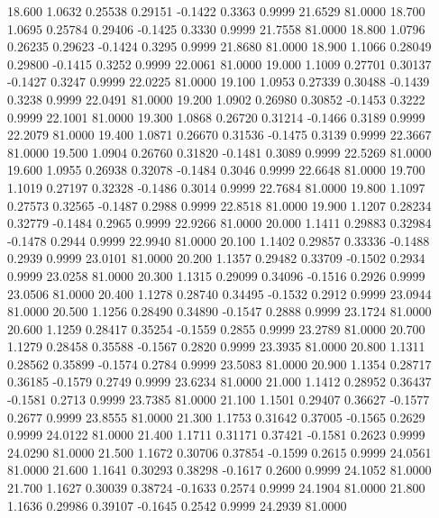   18.600   1.0632   0.25538   0.29151  -0.1422   0.3363   0.9999  21.6529  81.0000
  18.700   1.0695   0.25784   0.29406  -0.1425   0.3330   0.9999  21.7558  81.0000
  18.800   1.0796   0.26235   0.29623  -0.1424   0.3295   0.9999  21.8680  81.0000
  18.900   1.1066   0.28049   0.29800  -0.1415   0.3252   0.9999  22.0061  81.0000
  19.000   1.1009   0.27701   0.30137  -0.1427   0.3247   0.9999  22.0225  81.0000
  19.100   1.0953   0.27339   0.30488  -0.1439   0.3238   0.9999  22.0491  81.0000
  19.200   1.0902   0.26980   0.30852  -0.1453   0.3222   0.9999  22.1001  81.0000
  19.300   1.0868   0.26720   0.31214  -0.1466   0.3189   0.9999  22.2079  81.0000
  19.400   1.0871   0.26670   0.31536  -0.1475   0.3139   0.9999  22.3667  81.0000
  19.500   1.0904   0.26760   0.31820  -0.1481   0.3089   0.9999  22.5269  81.0000
  19.600   1.0955   0.26938   0.32078  -0.1484   0.3046   0.9999  22.6648  81.0000
  19.700   1.1019   0.27197   0.32328  -0.1486   0.3014   0.9999  22.7684  81.0000
  19.800   1.1097   0.27573   0.32565  -0.1487   0.2988   0.9999  22.8518  81.0000
  19.900   1.1207   0.28234   0.32779  -0.1484   0.2965   0.9999  22.9266  81.0000
  20.000   1.1411   0.29883   0.32984  -0.1478   0.2944   0.9999  22.9940  81.0000
  20.100   1.1402   0.29857   0.33336  -0.1488   0.2939   0.9999  23.0101  81.0000
  20.200   1.1357   0.29482   0.33709  -0.1502   0.2934   0.9999  23.0258  81.0000
  20.300   1.1315   0.29099   0.34096  -0.1516   0.2926   0.9999  23.0506  81.0000
  20.400   1.1278   0.28740   0.34495  -0.1532   0.2912   0.9999  23.0944  81.0000
  20.500   1.1256   0.28490   0.34890  -0.1547   0.2888   0.9999  23.1724  81.0000
  20.600   1.1259   0.28417   0.35254  -0.1559   0.2855   0.9999  23.2789  81.0000
  20.700   1.1279   0.28458   0.35588  -0.1567   0.2820   0.9999  23.3935  81.0000
  20.800   1.1311   0.28562   0.35899  -0.1574   0.2784   0.9999  23.5083  81.0000
  20.900   1.1354   0.28717   0.36185  -0.1579   0.2749   0.9999  23.6234  81.0000
  21.000   1.1412   0.28952   0.36437  -0.1581   0.2713   0.9999  23.7385  81.0000
  21.100   1.1501   0.29407   0.36627  -0.1577   0.2677   0.9999  23.8555  81.0000
  21.300   1.1753   0.31642   0.37005  -0.1565   0.2629   0.9999  24.0122  81.0000
  21.400   1.1711   0.31171   0.37421  -0.1581   0.2623   0.9999  24.0290  81.0000
  21.500   1.1672   0.30706   0.37854  -0.1599   0.2615   0.9999  24.0561  81.0000
  21.600   1.1641   0.30293   0.38298  -0.1617   0.2600   0.9999  24.1052  81.0000
  21.700   1.1627   0.30039   0.38724  -0.1633   0.2574   0.9999  24.1904  81.0000
  21.800   1.1636   0.29986   0.39107  -0.1645   0.2542   0.9999  24.2939  81.0000
